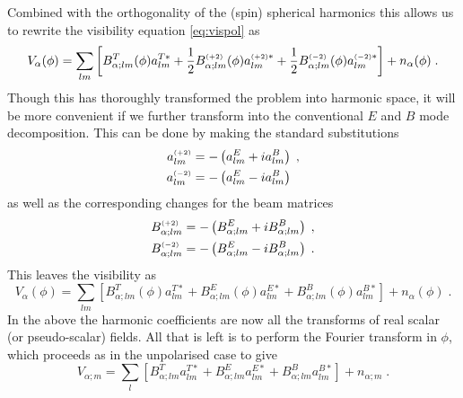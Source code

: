 \documentclass{revtex4}
\begin{document}
Combined with the orthogonality of the (spin) spherical harmonics this
allows us to rewrite the visibility equation \eqref{eq:vispol} as
\begin{equation}
V_{\alpha}(\phi) = \sum_{lm} \left[B_{\alpha;lm}^T(\phi) a^{T*}_{lm} +
\frac{1}{2} B_{\alpha;lm}^{\scriptscriptstyle \left(+2\right)}(\phi) a^{{\scriptscriptstyle \left(+2\right)}*}_{lm} +
\frac{1}{2} B_{\alpha;lm}^{\scriptscriptstyle \left(-2\right)}(\phi) a^{{\scriptscriptstyle \left(-2\right)}*}_{lm}\right] + n_{\alpha}(\phi)
\; .
\end{equation}
Though this has thoroughly transformed the problem into harmonic
space, it will be more convenient if we further transform into the
conventional $E$ and $B$ mode decomposition. This can be done by
making the standard substitutions
\begin{align}
a^{\scriptscriptstyle \left(+2\right)}_{lm} & = -\left(a^E_{lm} + i a^B_{lm}\right) \; ,\\
a^{\scriptscriptstyle \left(-2\right)}_{lm} & = -\left(a^E_{lm} - i a^B_{lm}\right)
\end{align}
as well as the corresponding changes for the beam matrices
\begin{align}
B^{\scriptscriptstyle \left(+2\right)}_{\alpha;lm} & = -\left(B^E_{\alpha;lm} + i B^B_{\alpha;lm}\right) \; ,\\
B^{\scriptscriptstyle \left(-2\right)}_{\alpha;lm} & = -\left(B^E_{\alpha;lm} - i
  B^B_{\alpha;lm}\right) \; .
\end{align}
This leaves the visibility as
\begin{equation}
V_{\alpha}(\phi) = \sum_{lm} \left[B_{\alpha;lm}^T(\phi) a^{T*}_{lm} +
B_{\alpha;lm}^E(\phi) a^{E*}_{lm} + B_{\alpha;lm}^B(\phi)
a^{B*}_{lm}\right] + n_{\alpha}(\phi)
\; .
\end{equation}
In the above the harmonic coefficients are now all the transforms of
real scalar (or pseudo-scalar) fields. All that is left is to perform
the Fourier transform in $\phi$, which proceeds as in the unpolarised
case to give
\begin{equation}
V_{\alpha; m} = \sum_{l} \left[B_{\alpha;lm}^T a^{T*}_{lm} +
B_{\alpha;lm}^E a^{E*}_{lm} + B_{\alpha;lm}^B
a^{B*}_{lm}\right] + n_{\alpha; m}
\; .
\end{equation}
\end{document}
